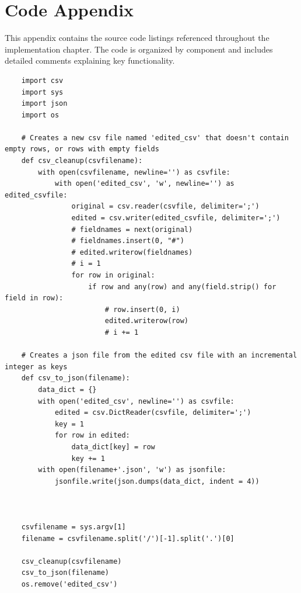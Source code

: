 \chapter*{Code Appendix}
\label{ch:code_appendix}

This appendix contains the source code listings referenced throughout the implementation chapter. The code is organized by component and includes detailed comments explaining key functionality.

\begin{verbatim}
    import csv
    import sys
    import json
    import os

    # Creates a new csv file named 'edited_csv' that doesn't contain empty rows, or rows with empty fields
    def csv_cleanup(csvfilename):
        with open(csvfilename, newline='') as csvfile:
            with open('edited_csv', 'w', newline='') as edited_csvfile:
                original = csv.reader(csvfile, delimiter=';')
                edited = csv.writer(edited_csvfile, delimiter=';')
                # fieldnames = next(original)
                # fieldnames.insert(0, "#")
                # edited.writerow(fieldnames)
                # i = 1
                for row in original:
                    if row and any(row) and any(field.strip() for field in row):
                        # row.insert(0, i)
                        edited.writerow(row)
                        # i += 1

    # Creates a json file from the edited csv file with an incremental integer as keys
    def csv_to_json(filename):
        data_dict = {}
        with open('edited_csv', newline='') as csvfile:
            edited = csv.DictReader(csvfile, delimiter=';')
            key = 1
            for row in edited: 
                data_dict[key] = row
                key += 1
        with open(filename+'.json', 'w') as jsonfile:
            jsonfile.write(json.dumps(data_dict, indent = 4))



    csvfilename = sys.argv[1]
    filename = csvfilename.split('/')[-1].split('.')[0]

    csv_cleanup(csvfilename)
    csv_to_json(filename)
    os.remove('edited_csv')
\end{verbatim}

